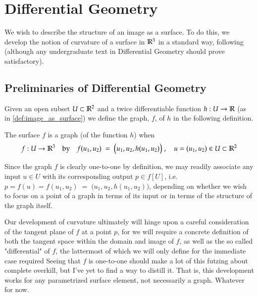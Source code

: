 \section{Differential Geometry} \label{sec:differential-geometry}
  
We wish to describe the structure of an image as a surface. To do this, we develop the notion of curvature of a surface in $\mathbb{R}^3$ in a standard way, following \cite{Kuhnel-DiffGeo} (although any undergraduate text in Differential Geometry should prove satisfactory).

\subsection{Preliminaries of Differential Geometry}
    Given an open subset $U\subset \mathbb{R}^2$ and a twice differentiable function  $h: U \to \mathbb{R}$ (as in \cref{def:image_as_surface})
    we define the graph, $f$, of $h$ in the following definition.
    
    \begin{defn} \label{def:graph}
    The surface $f$ is a graph (of the function $h$) when 
    \[
     f: U \to \mathbb{R}^3 \quad \textrm{by} \quad f(u_1, u_2) \;=\; \big(u_1 , u_2 , h(u_1,u_2)\big)
     \;,\quad u = (u_1, u_2) \in U \subset \mathbb{R}^2 \]
    \end{defn}
    Since the graph $f$ is clearly one-to-one by definition, we may readily associate any input $u\in U$ with
    its corresponding output $p \in f[U]$, i.e.
    $ p = f(u) = f(u_1, u_2) \;=\; \big(u_1 , u_2 , h(u_1,u_2)\big)$,
    depending on whether we wish to focus on a point of a graph in terms of its input
    or in terms of the structure of the graph itself.
    
    Our development of curvature ultimately will hinge upon a careful consideration of the tangent plane of $f$ at a point $p$, for we will require a concrete definition of both the tangent space within the domain and image of $f$,
    as well as the so called "differential" of $f$,
    the lattermost of which we will only define for the immediate case required
    Seeing that $f$ is one-to-one should make a lot of this
    futzing about complete overkill, but I've yet to find a way to distill it. That is, this development works for any parametrized surface element, not necessarily a graph. Whatever for now.
    
